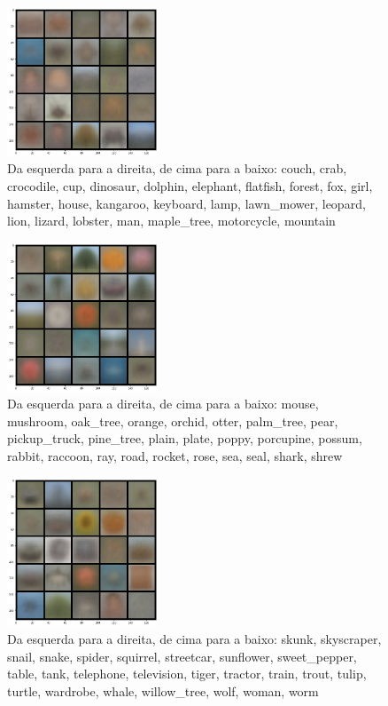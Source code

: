 \documentclass[conference]{IEEEtran}
\begin{document}
\begin{figure}[H]
\centerline{\includegraphics[width=0.4\textwidth]{Images/img_mean2.png}}
\caption{\label{fig:img_mean2}Da esquerda para a direita, de cima para a baixo: couch, crab, crocodile, cup, dinosaur, dolphin, elephant, flatfish, forest, fox, girl, hamster, house, kangaroo, keyboard, lamp, lawn\_mower, leopard, lion, lizard, lobster, man, maple\_tree, motorcycle, mountain}
\end{figure}

\begin{figure}[H]
\centerline{\includegraphics[width=0.4\textwidth]{Images/img_mean3.png}}
\caption{\label{fig:img_mean3}Da esquerda para a direita, de cima para a baixo: mouse, mushroom, oak\_tree, orange, orchid, otter, palm\_tree, pear, pickup\_truck, pine\_tree, plain, plate, poppy, porcupine, possum, rabbit, raccoon, ray, road, rocket, rose, sea, seal, shark, shrew}
\end{figure}

\begin{figure}[H]
\centerline{\includegraphics[width=0.4\textwidth]{Images/img_mean4.png}}
\caption{\label{fig:img_mean4}Da esquerda para a direita, de cima para a baixo: skunk, skyscraper, snail, snake, spider, squirrel, streetcar, sunflower, sweet\_pepper, table, tank, telephone, television, tiger, tractor, train, trout, tulip, turtle, wardrobe, whale, willow\_tree, wolf, woman, worm}
\end{figure}
\end{document}
